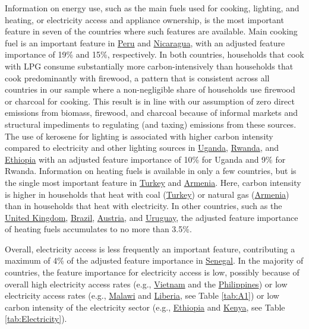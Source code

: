 \documentclass[12pt, a4paper]{article}
\begin{document}
Information on energy use, such as the main fuels used for cooking, lighting, and heating, or electricity access and appliance ownership, is the most important feature in seven of the countries where such features are available. Main cooking fuel is an important feature in \hyperref[fig:5b_PER]{Peru} and \hyperref[fig:5b_NIC]{Nicaragua}, with an adjusted feature importance of 19\% and 15\%, respectively. In both countries, households that cook with LPG consume substantially more carbon-intensively than households that cook predominantly with firewood, a pattern that is consistent across all countries in our sample where a non-negligible share of households use firewood or charcoal for cooking. This result is in line with our assumption of zero direct emissions from biomass, firewood, and charcoal because of informal markets and structural impediments to regulating (and taxing) emissions from these sources. The use of kerosene for lighting is associated with higher carbon intensity compared to electricity and other lighting sources in \hyperref[fig:5b_UGA]{Uganda}, \hyperref[fig:5b_RWA]{Rwanda}, and \hyperref[fig:5b_ETH]{Ethiopia} with an adjusted feature importance of 10\% for Uganda and 9\% for Rwanda. Information on heating fuels is available in only a few countries, but is the single most important feature in \hyperref[fig:5b_TUR]{Turkey} and \hyperref[fig:5b_ARM]{Armenia}. Here, carbon intensity is higher in households that heat with coal (\hyperref[fig:5b_TUR]{Turkey}) or natural gas (\hyperref[fig:5b_ARM]{Armenia}) than in households that heat with electricity. In other countries, such as the \hyperref[fig:5b_GBR]{United Kingdom}, \hyperref[fig:5b_BRA]{Brazil}, \hyperref[fig:5b_AUT]{Austria}, and \hyperref[fig:5b_URY]{Uruguay}, the adjusted feature importance of heating fuels accumulates to no more than 3.5\%.

Overall, electricity access is less frequently an important feature, contributing a maximum of 4\% of the adjusted feature importance in \hyperref[fig:5b_SEN]{Senegal}. In the majority of countries, the feature importance for electricity access is low, possibly because of overall high electricity access rates (e.g., \hyperref[fig:5b_VNM]{Vietnam} and the \hyperref[fig:5b_PHL]{Philippines}) or low electricity access rates (e.g., \hyperref[fig:5b_MWI]{Malawi} and \hyperref[fig:5b_LBR]{Liberia}, see Table \ref{tab:A1}) or low carbon intensity of the electricity sector (e.g., \hyperref[fig:5b_ETH]{Ethiopia} and \hyperref[fig:5b_KEN]{Kenya}, see Table \ref{tab:Electricity}).
\end{document}
